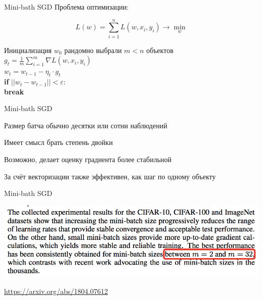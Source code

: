 \documentclass[notes,12pt, aspectratio=169]{beamer}
\newcommand{\pgr}[1]{{\color{green} \textbf{#1}}}
\newenvironment{wideitemize}{\itemize\addtolength{\itemsep}{10pt}}{\enditemize}
\begin{document}
\begin{frame}[fragile]{Mini-bath SGD}
	Проблема оптимизации: 
	
	\[   
	L(w) = \sum_{i=1}^n L(w, x_i, y_i) \to \min_{w}
	\]
	
	Инициализация $w_0$ 
	\pgr{\hspace{15pt}} рандомно выбрали $m < n$ объектов \\
	\pgr{\hspace{15pt}} $g_t =\frac{1}{m}\sum_{i=1}^m  \nabla L(w, x_i, y_i)$ \\
	\pgr{\hspace{15pt}} $w_t = w _{t-1} - \eta_t \cdot g_t   $ \\
	\pgr{\hspace{15pt} if} $||w_t - w_{t-1}|| < \varepsilon:$ \\
	\pgr{\hspace{30pt} break}
\end{frame}


\begin{frame}{Mini-bath SGD}
	\begin{wideitemize}
		\item Размер батча обычно десятки или сотни наблюдений
	
		\item Имеет смысл брать степень двойки
		
		\item Возможно, делает оценку градиента более стабильной 
		
		\item За счёт векторизации также эффективен, как шаг по одному объекту 
	\end{wideitemize}
\end{frame}



\begin{frame}{Mini-bath SGD}
\begin{center}
	\includegraphics[width=0.95\paperwidth]{mini_batch.png}
\end{center}
\vfill %
\footnotesize 
\color{blue} \url{https://arxiv.org/abs/1804.07612}
\end{frame}
\end{document}
